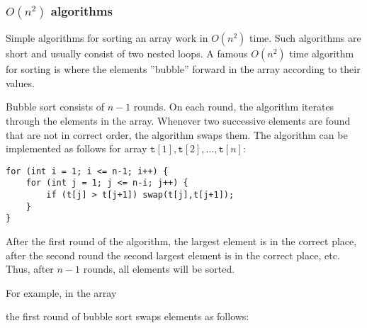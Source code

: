 \subsubsection{$O(n^2)$ algorithms}


Simple algorithms for sorting an array
work in $O(n^2)$ time.
Such algorithms are short and usually
consist of two nested loops.
A famous $O(n^2)$ time algorithm for sorting
is  where the elements
''bubble'' forward in the array according to their values.

Bubble sort consists of $n-1$ rounds.
On each round, the algorithm iterates through
the elements in the array.
Whenever two successive elements are found
that are not in correct order,
the algorithm swaps them.
The algorithm can be implemented as follows
for array
$\texttt{t}[1],\texttt{t}[2],\ldots,\texttt{t}[n]$:
\begin{lstlisting}
for (int i = 1; i <= n-1; i++) {
    for (int j = 1; j <= n-i; j++) {
        if (t[j] > t[j+1]) swap(t[j],t[j+1]);
    }
}
\end{lstlisting}

After the first round of the algorithm,
the largest element is in the correct place,
after the second round the second largest
element is in the correct place, etc.
Thus, after $n-1$ rounds, all elements
will be sorted.

For example, in the array

\begin{center}
\end{center}

\noindent
the first round of bubble sort swaps elements
as follows:

\begin{center}
\end{center}

